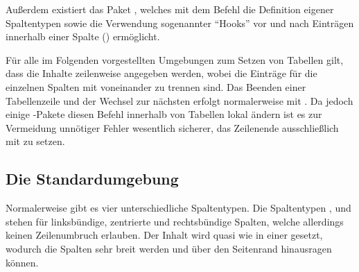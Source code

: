 \documentclass[%
  english,ngerman,%
  geometry=no,DIV=12,automark,%
]{tudscrartcl}
\begin{document}
Außerdem existiert das Paket , welches mit dem Befehl 
 die Definition eigener Spaltentypen sowie die Verwendung 
sogenannter \enquote{Hooks} vor und nach Einträgen innerhalb einer Spalte 
(\PValue{>\{\dots\}}\PValue{<\{\dots\}}) ermöglicht.

Für alle im Folgenden vorgestellten Umgebungen zum Setzen von Tabellen gilt, 
dass die Inhalte zeilenweise angegeben werden, wobei die Einträge für die 
einzelnen Spalten mit \PValue{\&} voneinander zu trennen sind. Das Beenden 
einer Tabellenzeile und der Wechsel zur nächsten erfolgt normalerweise mit 
\Macro{\bsc}. Da jedoch einige -Pakete diesen Befehl innerhalb 
von Tabellen lokal ändern ist es zur Vermeidung unnötiger Fehler wesentlich 
sicherer, das Zeilenende ausschließlich mit  zu setzen.


\subsection{Die Standardumgebung }
Normalerweise gibt es vier unterschiedliche Spaltentypen. Die Spaltentypen 
,  und  stehen für linksbündige, zentrierte und 
rechtsbündige Spalten, welche allerdings keinen Zeilenumbruch erlauben. Der 
Inhalt wird quasi wie in einer  gesetzt, wodurch die Spalten sehr 
breit werden und über den Seitenrand hinausragen können.
\end{document}
